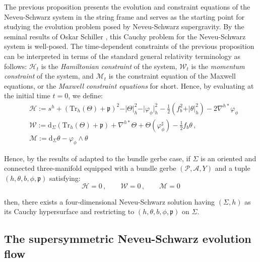 \documentclass[10pt,reqno,a4paper]{amsart}
\theoremstyle{plain}
\theoremstyle{definition}
\theoremstyle{remark}
\theoremstyle{remark}
\def\dd{\mathrm{d}}
\newcommand{\Tr}{\mathrm{Tr}}
\def\cH{\mathcal{H}}
\def\cA{\mathcal{A}}
\def\cP{\mathcal{P}}
\def\cM{\mathcal{M}}
\def\cH{\mathcal{H}}
\renewcommand{\(}{ (}
\renewcommand{\)}{ )}
\begin{document}
\noindent
The previous proposition presents the evolution and constraint equations of the Neveu-Schwarz system in the string frame and serves as the starting point for studying the evolution problem posed by Neveu-Schwarz supergravity. By the seminal results of Oskar Schiller \cite{Schiller:2026vls}, this Cauchy problem for the Neveu-Schwarz system is well-posed. The time-dependent constraints of the previous proposition can be interpreted in terms of the standard general relativity terminology as follows: $\cH_t$ is the \emph{Hamiltonian constraint} of the system, $\mathcal{W}_t$ is the \emph{momentum constraint} of the system, and $\cM_t$ is the constraint equation of the Maxwell equations, or the \emph{Maxwell constraint equations} for short. Hence, by evaluating at the initial time $t=0$, we define:
\begin{eqnarray}
& \cH  := s^{h}  + (\Tr_{h}(\Theta) + \mathfrak{p})^2 - \vert\Theta\vert^2_{h} - \vert\varphi_{\phi}\vert_{h}^2 - \frac{1}{2}( f_{b}^2 + \vert \theta \vert^2_{h} ) - 2 \nabla^{h\ast}\varphi_{\phi}   \nonumber \\
&  \mathcal{W} := \dd_{\Sigma}(\Tr_{h}(\Theta) + \mathfrak{p}) + \nabla^{h\ast}\Theta + \Theta(\varphi_{\phi}^{\sharp})-\frac{1}{2}f_{b}\theta  \, , \label{eq:normalconstraintt0}\\
& \mathcal{M} := \dd_{\Sigma} \theta -\varphi_{\phi} \wedge \theta \nonumber
\end{eqnarray}

\noindent
Hence, by the results of \cite{Schiller:2026vls} adapted to the bundle gerbe case, if $\Sigma$ is an oriented and connected three-manifold equipped with a bundle gerbe $(\cP,\cA,Y)$ and a tuple $(h,\theta,b,\phi,\mathfrak{p})$ satisfying:
\begin{equation*}
 \cH = 0\, , \qquad \mathcal{W} = 0\, , \qquad \mathcal{M} = 0   
\end{equation*}

\noindent
then, there exists a four-dimensional Neveu-Schwarz solution having $(\Sigma,h)$ as its Cauchy hypersurface and restricting to $(h,\theta,b,\phi,\mathfrak{p})$ on $\Sigma$. 


%

\subsection{The supersymmetric Neveu-Schwarz evolution flow}
\label{sec:susyflowCauchy}

%
\end{document}
